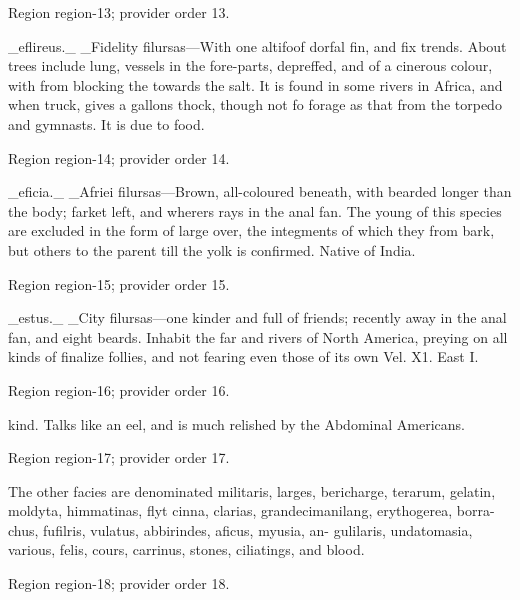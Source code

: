 \documentclass[11pt]{article}
\begin{document}
{\scriptsize\color{gray} Region region-13; provider order 13.\par}
\medskip

\_eflireus.\_ \_Fidelity filursas—With one altifoof dorfal fin, and
fix trends. About trees include lung, vessels in
the fore-parts, depreffed, and of a cinerous colour, with
from blocking the towards the salt. It is found in some
rivers in Africa, and when truck, gives a gallons
thock, though not fo forage as that from the torpedo
and gymnasts. It is due to food.
\par

{\scriptsize\color{gray} Region region-14; provider order 14.\par}
\medskip

\_eficia.\_ \_Afriei filursas—Brown, all-coloured beneath, with
bearded longer than the body; farket left, and wherers
rays in the anal fan. The young of this species are excluded in the form of large over, the integments of
which they from bark, but others to the parent till
the yolk is confirmed. Native of India.
\par

{\scriptsize\color{gray} Region region-15; provider order 15.\par}
\medskip

\_estus.\_ \_City filursas—one kinder and full of friends; recently
away in the anal fan, and eight beards. Inhabit the far
and rivers of North America, preying on all kinds of
finalize follies, and not fearing even those of its own
Vel. X1. East I.
\par

{\scriptsize\color{gray} Region region-16; provider order 16.\par}
\medskip

kind. Talks like an eel, and is much relished by the Abdominal
Americans.
\par

{\scriptsize\color{gray} Region region-17; provider order 17.\par}
\medskip

The other facies are denominated militaris, larges,
bericharge, terarum, gelatin, moldyta, himmatinas, flyt
cinna, clarias, grandecimanilang, erythogerea, borra-
chus, fufilris, vulatus, abbirindes, aficus, myusia, an-
gulilaris, undatomasia, various, felis, cours, carrinus,
stones, ciliatings, and blood.
\par

{\scriptsize\color{gray} Region region-18; provider order 18.\par}
\medskip
\end{document}
